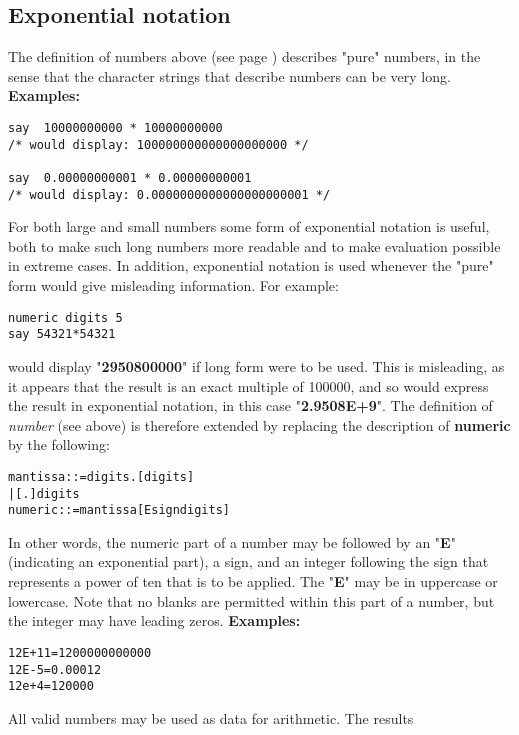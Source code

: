 \subsection{Exponential notation}
 The definition of numbers  above (see page \pageref{refdefnum}) 
describes "pure" numbers, in the sense that the character strings
that describe numbers can be very long.
 \textbf{Examples:}
\begin{lstlisting}
say  10000000000 * 10000000000
/* would display: 100000000000000000000 */

say  0.00000000001 * 0.00000000001
/* would display: 0.0000000000000000000001 */
\end{lstlisting}
For both large and small numbers some form of exponential notation
is useful, both to make such long numbers more readable and to make
evaluation possible in extreme cases.  In addition, exponential notation
is used whenever the "pure" form would give misleading
information.  For example:
\begin{lstlisting}
numeric digits 5
say 54321*54321
\end{lstlisting}
would display "\textbf{2950800000}" if long form were to be
used.
This is misleading, as it appears that the result is an exact multiple
of 100000, and so \nr{} would express the result in exponential
notation, in this case "\textbf{2.9508E+9}".
 The definition of \emph{number} (see above) is therefore extended
by replacing the description of \textbf{numeric} by the following:
\begin{alltt}
mantissa ::=  digits . [digits]
              | [.] digits
numeric  ::=  mantissa [E sign digits]
\end{alltt}
In other words, the numeric part of a number may be followed by an
"\textbf{E}" (indicating an exponential part), a sign,
and an integer following the sign that represents a power of ten that is
to be applied.
The "\textbf{E}" may be in uppercase or lowercase.
Note that no blanks are permitted within this part of a number, but the
integer may have leading zeros.
 \textbf{Examples:}
\begin{alltt}
12E+11  =  1200000000000
12E-5   =  0.00012
 12e+4  =  120000
\end{alltt}
 All valid numbers may be used as data for arithmetic.  The results
